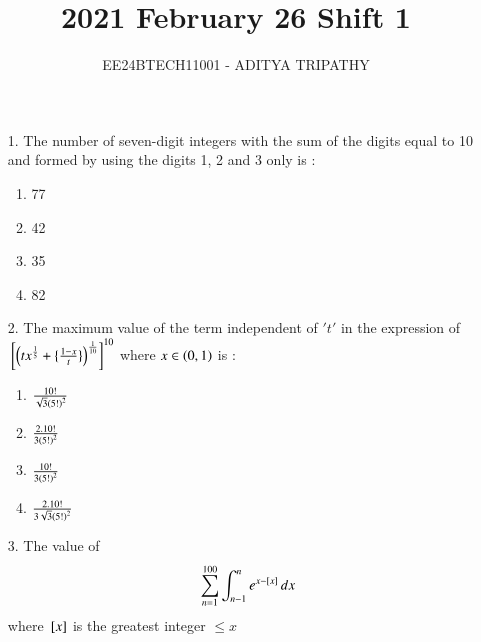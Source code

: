 \documentclass[journal,12pt,onecolumn]{IEEEtran}
\theoremstyle{remark}
\begin{document}

\vspace{3cm}

\title{2021 February 26 Shift 1}
\author{EE24BTECH11001 -  ADITYA TRIPATHY}
\maketitle

\renewcommand{\thefigure}{\theenumi}
\renewcommand{\thetable}{\theenumi}

\begin{enumerate}
	\item[1.] 
		The number of seven-digit integers with the sum of the digits equal to 10 and formed by using the digits 1, 2 and 3 only is :
	\begin{multicols}{4}
		\begin{enumerate}
			\item 77 
			\columnbreak
			\item 42
			\columnbreak
			\item 35
			\columnbreak
			\item 82
		\end{enumerate}
	\end{multicols}

	\item[2.] 
		The maximum value of the term independent of $'t'$ in the expression of
		${}\left[\left(tx^{\frac{1}{5}}+ \{ \frac{1 - x}{t}\}\right) ^{\frac{1}{10}}\right]^{10}$ where
		$x \in \left(0, 1\right)$ is :
		\begin{multicols}{4}
		\begin{enumerate}
			\item $\frac{10!}{\sqrt{3}\left(5!\right)^{2}}$ \columnbreak
			\item $\frac{2 . 10!}{3\left(5!\right)^2}$ \columnbreak
			\item $\frac{10!}{3\left(5!\right)^2}$ \columnbreak
			\item $\frac{2 . 10!}{3\sqrt{3}\left(5!\right)^2}$
		\end{enumerate}
	\end{multicols}


\item[3.] The value of 
	\begin{align}
		\sum_{n = 1}^{100} \int_{n - 1}^n e^{x - {}\left[x\right]} \, dx
	\end{align} where ${}\left[x\right]$ is the greatest integer $\le x$
		\begin{enumerate}
			\begin{multicols}{2}
			\item $100\brak{e - 1}$ \columnbreak
			\item $100e$
			\end{multicols}
		\end{enumerate}
		

\end{enumerate}
\end{document}
